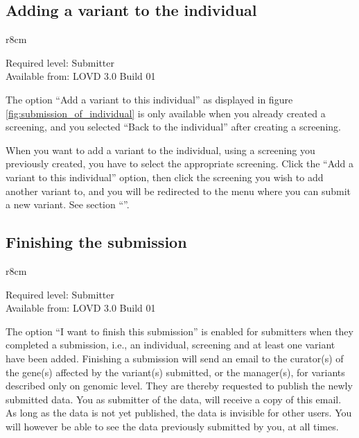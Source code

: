 \hypertarget{ssec:add_variant_to_an_individual}{}
\subsection{Adding a variant to the individual}
\begin{wrapfigure}[3]{r}{8cm} %
  \vspace{-25pt}
  \begin{leftbar}
    Required level: Submitter\\
    Available from: LOVD 3.0 Build 01
  \end{leftbar}
\end{wrapfigure}
The option ``Add a variant to this individual'' as displayed in figure \ref{fig:submission_of_individual} is only
 available when you already created a screening, and you selected ``Back to the individual'' after creating a
 screening.

When you want to add a variant to the individual, using a screening you previously created,
 you have to select the appropriate screening.
Click the ``Add a variant to this individual'' option, then click the screening you wish to add another variant to,
 and you will be redirected to the menu where you can submit a new variant.
See section ``''.



\hypertarget{ssec:finish_submission}{}
\subsection{Finishing the submission}
\begin{wrapfigure}[3]{r}{8cm} %
  \vspace{-25pt}
  \begin{leftbar}
    Required level: Submitter\\
    Available from: LOVD 3.0 Build 01
  \end{leftbar}
\end{wrapfigure}
The option ``I want to finish this submission'' is enabled for submitters when they completed a submission,
 i.e., an individual, screening and at least one variant have been added.
Finishing a submission will send an email to the curator(s) of the gene(s) affected by the variant(s) submitted,
 or the manager(s), for variants described only on genomic level.
They are thereby requested to publish the newly submitted data.
You as submitter of the data, will receive a copy of this email.
As long as the data is not yet published, the data is invisible for other users.
You will however be able to see the data previously submitted by you, at all times.





